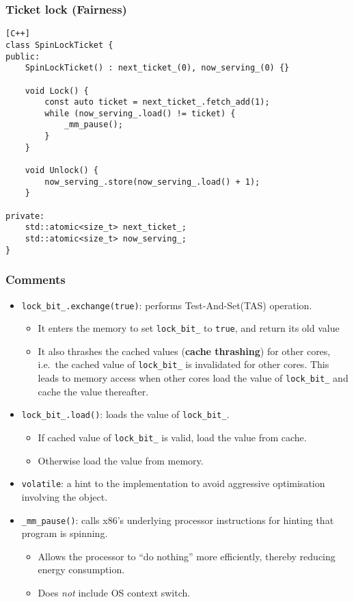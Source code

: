 \documentclass[twocolumn,landscape,10pt]{article}
\theoremstyle{definition}
\begin{document}
\subsubsection{Ticket lock (Fairness)}
\begin{lstlisting}[C++]
class SpinLockTicket {
public:
    SpinLockTicket() : next_ticket_(0), now_serving_(0) {}

    void Lock() {
        const auto ticket = next_ticket_.fetch_add(1);
        while (now_serving_.load() != ticket) {
            _mm_pause();
        }
    }

    void Unlock() {
        now_serving_.store(now_serving_.load() + 1);
    }

private:
    std::atomic<size_t> next_ticket_;
    std::atomic<size_t> now_serving_;
}
\end{lstlisting} 
\medskip
\subsubsection{Comments}
\begin{itemize}
    \item \texttt{lock\_bit\_.exchange(true)}: 
        performs Test-And-Set(TAS) operation.
        \begin{itemize}
            \item It enters the memory to set \texttt{lock\_bit\_} to
                \texttt{true}, and return its old value
            \item It also thrashes the cached values (\textbf{cache thrashing})
                for other cores, i.e.\
                the cached value of \texttt{lock\_bit\_} is invalidated for
                other cores. This leads to memory access 
                when other cores load the value of \texttt{lock\_bit\_} 
                and cache the value thereafter.
        \end{itemize} 
    \item \texttt{lock\_bit\_.load()}:
        loads the value of \texttt{lock\_bit\_}.
        \begin{itemize}
            \item If cached value of \texttt{lock\_bit\_} is valid, load the
                value from cache.
            \item Otherwise load the value from memory.
        \end{itemize} 
    \item \texttt{volatile}:
        a hint to the implementation to avoid aggressive optimisation involving
        the object.
    \item \texttt{\_mm\_pause()}:
        calls x86's underlying processor instructions for hinting that program
        is spinning.
        \begin{itemize}
            \item Allows the processor to ``do nothing'' more efficiently,
                thereby reducing energy consumption.
            \item Does \emph{not} include OS context switch.
        \end{itemize} 
\end{itemize} 
\end{document}
